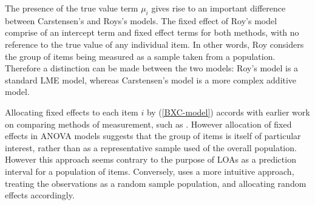 \documentclass[12pt, a4paper]{report}
\theoremstyle{plain}
\theoremstyle{definition}
\theoremstyle{remark}
\begin{document}
%	
	
	
	
	The presence of the true value term $\mu_i$ gives rise to an important difference between Carstensen's and Roys's models. The fixed effect of Roy's model comprise of an intercept term and fixed effect terms for both methods, with no reference to the true value of any individual item. In other words, Roy considers the group of items being measured as a sample taken from a population. Therefore a distinction can be made between the two models: Roy's model is a standard LME model, whereas Carstensen's model is a more complex additive model.
	
	
	Allocating fixed effects to each item $i$ by (\ref{BXC-model}) accords with earlier work on comparing methods of measurement, such as \citet{Grubbs48}. However allocation of fixed effects in ANOVA models suggests that the group of items is itself of particular interest, rather than as a representative sample used of the overall population. However this approach seems contrary to the purpose of LOAs as a prediction interval for a population of items. Conversely, \citet{ARoy2009}
	uses a more intuitive approach, treating the observations as a random sample population, and allocating random effects accordingly.
	
\end{document}
